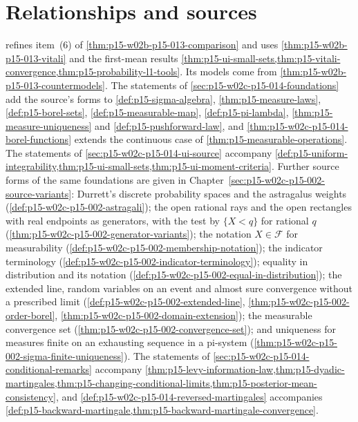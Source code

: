 \section{Relationships and sources}
\label{sec:p15-w02c-p15-014-relations}

 refines item~(6) of
\cref{thm:p15-w02b-p15-013-comparison} and uses
\cref{thm:p15-w02b-p15-013-vitali} and the first-mean results
\cref{thm:p15-ui-small-sets,thm:p15-vitali-convergence,thm:p15-probability-l1-tools}.
Its models come from \cref{thm:p15-w02b-p15-013-countermodels}. The
statements of \cref{sec:p15-w02c-p15-014-foundations} add the source's
forms to \cref{def:p15-sigma-algebra}, \cref{thm:p15-measure-laws},
\cref{def:p15-borel-sets},
\cref{def:p15-measurable-map}, \cref{def:p15-pi-lambda},
\cref{thm:p15-measure-uniqueness} and \cref{def:p15-pushforward-law}, and
\cref{thm:p15-w02c-p15-014-borel-functions} extends the continuous case of
\cref{thm:p15-measurable-operations}. The statements of
\cref{sec:p15-w02c-p15-014-ui-source} accompany
\cref{def:p15-uniform-integrability,thm:p15-ui-small-sets,thm:p15-ui-moment-criteria}. Further source forms of the same
foundations are given in Chapter~\ref{sec:p15-w02c-p15-002-source-variants}: Durrett's discrete probability spaces and
the astragalus weights (\cref{def:p15-w02c-p15-002-astragali}); the
open rational rays and the open rectangles with real endpoints as
generators, with the test by \(\{X<q\}\) for rational \(q\)
(\cref{thm:p15-w02c-p15-002-generator-variants}); the notation
\(X\in\mathcal F\) for measurability
(\cref{def:p15-w02c-p15-002-membership-notation}); the indicator
terminology (\cref{def:p15-w02c-p15-002-indicator-terminology});
equality in distribution and its notation
(\cref{def:p15-w02c-p15-002-equal-in-distribution}); the
extended line, random variables on an event and almost sure convergence
without a prescribed limit
(\cref{def:p15-w02c-p15-002-extended-line},
\cref{thm:p15-w02c-p15-002-order-borel},
\cref{thm:p15-w02c-p15-002-domain-extension}); the measurable
convergence set (\cref{thm:p15-w02c-p15-002-convergence-set}); and
uniqueness for measures finite on an exhausting sequence in a pi-system
(\cref{thm:p15-w02c-p15-002-sigma-finite-uniqueness}). The statements of
\cref{sec:p15-w02c-p15-014-conditional-remarks} accompany
\cref{thm:p15-levy-information-law,thm:p15-dyadic-martingales,thm:p15-changing-conditional-limits,thm:p15-posterior-mean-consistency},
and \cref{def:p15-w02c-p15-014-reversed-martingales} accompanies
\cref{def:p15-backward-martingale,thm:p15-backward-martingale-convergence}.

